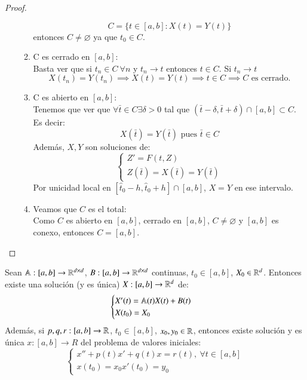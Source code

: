 \begin{proof}
\begin{enumerate}
\begin{enumerate}
        $$C = \{t\in [a, b] : X(t) = Y(t)\}$$ entonces $C \neq \varnothing$ ya que $t_0\in C$.
        \item C es cerrado en $[a, b]$:\\
        Basta ver que si $t_n \in C\ \forall n$ y $t_n \to t$ entonces $t \in C$. Si $t_n \to t$
        $$
            X(t_n) = Y(t_n) \implies X(t) = Y(t) \implies t \in C \implies C \text{ es cerrado.}
        $$
        \item C es abierto en $[a, b]$:\\
        Tenemos que ver que $\forall \bar{t}\in C \exists \delta > 0$ tal que $(\bar{t} - \delta, \bar{t} + \delta) \cap [a, b] \subset C$. Es decir:
        $$
            X(\bar{t}) = Y(\bar{t}) \text{ pues }\bar{t} \in C
        $$
        Además, $X, Y$ son soluciones de:
        $$
        \begin{cases}
            Z' = F(t, Z)\\
            Z(\bar{t}) = X(\bar{t}) = Y(\bar{t})
        \end{cases}
        $$
        Por unicidad local en $[\hat{t}_0 - h, \hat{t}_0 + h] \cap[a, b]$, $X=Y$ en ese intervalo.
        \item Veamos que $C$ es el total:\\
        Como $C$ es abierto en $[a,b]$, cerrado en $[a, b]$,  $C \neq \varnothing$ y $[a, b]$ es conexo, entonces $C = [a, b]$.
        \end{enumerate}
    \end{enumerate}

\end{proof}
\begin{cor}
    Sean $\mathbb{A} : [a, b]\to \mathbb{R}^{d\times d}$, $B : [a, b]\to\mathbb{R}^{d\times d}$ continuas, $t_0 \in [a, b]$, $X_0 \in \mathbb{R}^d$. Entonces existe una solución (y es única) $X : [a, b] \to \mathbb{R}^d$ de:
    $$
        \begin{cases}
            X'(t) = \mathbb{A}(t) X(t) + B(t)\\
            X(t_0) = X_0
        \end{cases}
    $$ %
    Además, si $p, q, r :[a, b] \to \mathbb{R}$, $t_0 \in [a, b]$, $x_0, y_0 \in \mathbb{R}$, entonces existe solución y es única $x : [a, b] \to R$ del problema de valores iniciales:
    $$
        \begin{cases}
            x'' + p(t) x' + q(t) x = r(t),\ \forall t \in [a,b]\\
            x(t_0) = x_0
            x'(t_0) = y_0
        \end{cases}
    $$
\end{cor}

